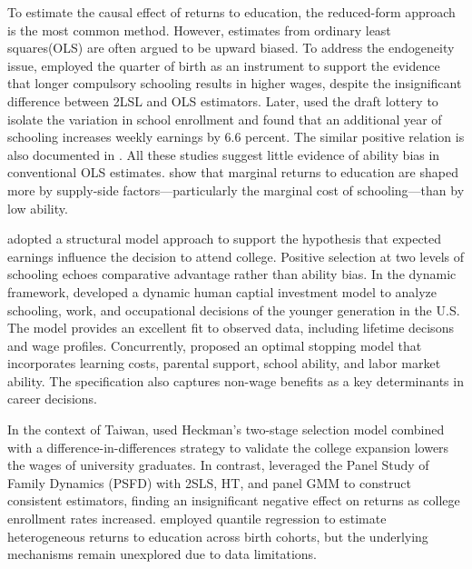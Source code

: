 \documentclass[a4paper, 12pt]{article}
\begin{document}
To estimate the causal effect of returns to education, the reduced-form approach is the most common method. 
However, estimates from ordinary least squares(OLS) are often argued to be upward biased.
To address the endogeneity issue, \cite{angrist1991does} employed the quarter of birth as an instrument to support the evidence that longer compulsory schooling
results in higher wages, despite the insignificant difference between 2LSL and OLS estimators.
Later, \cite{angrist1992estimating} used the draft lottery to isolate the variation in school enrollment and found that
an additional year of schooling increases weekly earnings by 6.6 percent.
The similar positive relation is also documented in \cite{card1993using}.
All these studies suggest little evidence of ability bias in conventional OLS estimates.
\cite{card1999causal, card2001estimating} show that marginal returns to education are shaped more by supply-side factors---particularly the marginal cost of schooling---than by low ability.

\cite{willis1979education} adopted a structural model approach to support the hypothesis that expected earnings influence the decision to attend college.
Positive selection at two levels of schooling echoes comparative advantage rather than ability bias.
In the dynamic framework, \cite{keane1997career} developed a dynamic human captial investment model to analyze schooling, work, and occupational decisions of the younger generation in the U.S. 
The model provides an excellent fit to observed data, including lifetime decisons and wage profiles.
Concurrently, \cite{belzil1997estimating} proposed an optimal stopping model that incorporates learning costs, parental support, school ability, and labor market ability. 
The specification also captures non-wage benefits as a key determinants in career decisions.

In the context of Taiwan, \cite{Hsu2021HigherEd} used Heckman's two-stage selection model combined with a difference-in-differences strategy to validate the college expansion lowers the wages of university graduates.
In contrast, \cite{Li2009ReturnsEducationTaiwan} leveraged the Panel Study of Family Dynamics (PSFD) with 2SLS, HT, and panel GMM to construct consistent estimators, finding an insignificant negative effect on returns as college enrollment rates increased.
\cite{ChuangLai2011CohortEducation} employed quantile regression to estimate heterogeneous returns to education across birth cohorts,
but the underlying mechanisms remain unexplored due to data limitations.
\end{document}
